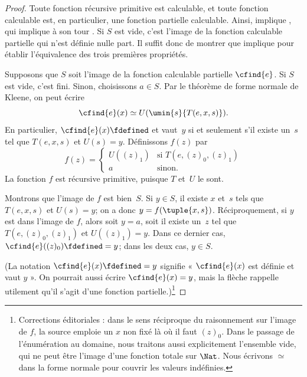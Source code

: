 \documentclass[../../../include/open-logic-section]{subfiles}
\begin{document}
\begin{proof}
Toute fonction récursive primitive est calculable,
et toute fonction calculable est, en particulier, une fonction partielle calculable.
Ainsi,  implique ,
qui implique à son tour .
Si $S$ est vide, c'est l'image de la fonction calculable
partielle qui n'est définie nulle part. Il suffit donc
de montrer que  implique
 pour établir l'équivalence
des trois premières propriétés.

Supposons que $S$ soit l'image de la fonction calculable
partielle $\cfind{e}$. Si $S$ est vide, c'est fini.
Sinon, choisissons $a\in S$. Par le théorème de forme
normale de Kleene, on peut écrire
\[
\cfind{e}(x) \simeq U(\umin{s}{T(e, x, s)}).
\]
En particulier, $\cfind{e}(x) \fdefined$ et vaut~$y$
si et seulement s'il existe un~$s$ tel que $T(e,x,s)$
et $U(s)=y$. Définissons $f(z)$ par
\[
f(z) = \begin{cases}
  U((z)_1) & \text{si $T(e, (z)_0, (z)_1)$} \\
  a        & \text{sinon.}
\end{cases}
\]
La fonction $f$ est récursive primitive, puisque
$T$ et~$U$ le sont. 

Montrons que l'image de $f$ est bien~$S$. Si $y\in S$,
il existe $x$ et~$s$ tels que $T(e,x,s)$ et $U(s)=y$;
on a donc $y=f(\tuple{x,s})$. Réciproquement, si $y$
est dans l'image de $f$, alors soit $y=a$, soit il
existe un~$z$ tel que $T(e,(z)_0,(z)_1)$ et
$U((z)_1)=y$. Dans ce dernier cas,
$\cfind{e}((z)_0)\fdefined=y$; dans les deux cas,
$y\in S$.

(La notation $\cfind{e}(x) \fdefined = y$ signifie
« $\cfind{e}(x)$ est définie et vaut $y$ ». On
pourrait aussi écrire $\cfind{e}(x)=y$, mais la
flèche rappelle utilement qu'il s'agit d'une fonction
partielle.)\footnote{Corrections éditoriales : dans le sens réciproque du raisonnement sur l'image de $f$, la source emploie un $x$ non fixé là où il faut $(z)_0$. Dans le passage de l'énumération au domaine, nous traitons aussi explicitement l'ensemble vide, qui ne peut être l'image d'une fonction totale sur $\Nat$. Nous écrivons $\simeq$ dans la forme normale pour couvrir les valeurs indéfinies.}


\end{proof}
\end{document}

